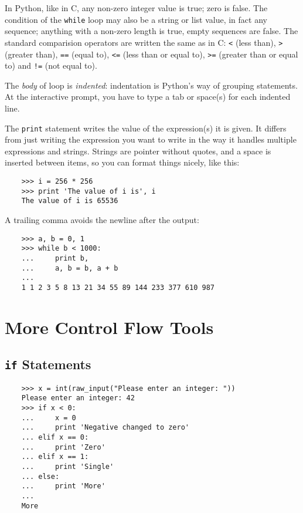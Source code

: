 \documentclass[UTF8]{article}
\begin{document}
In Python, like in C, any non-zero integer value is true; zero is false. The condition of the
\texttt{while} loop may also be a string or list value, in fact any sequence; anything with a
non-zero length is true, empty sequences are false. The standard comparision operators are written
the same as in C: \texttt{<} (less than), \texttt{>} (greater than), \texttt{==} (equal to),
\texttt{<=} (less than or equal to), \texttt{>=} (greater than or equal to) and \texttt{!=} (not
equal to).

The \emph{body} of loop is \emph{indented}: indentation is Python's way of grouping statements.
At the interactive prompt, you have to type a tab or space(s) for each indented line.

The \texttt{print} statement writes the value of the expression(s) it is given. It differs from
just writing the expression you want to write in the way it handles multiple expressions and
strings. Strings are pointer without quotes, and a space is inserted between items, so you can
format things nicely, like this:
\begin{verbatim}
    >>> i = 256 * 256
    >>> print 'The value of i is', i
    The value of i is 65536
\end{verbatim}

A trailing comma avoids the newline after the output:
\begin{verbatim}
    >>> a, b = 0, 1
    >>> while b < 1000:
    ...     print b,
    ...     a, b = b, a + b
    ...
    1 1 2 3 5 8 13 21 34 55 89 144 233 377 610 987
\end{verbatim}

\section{More Control Flow Tools}
\subsection{\texttt{if} Statements}
\begin{verbatim}
    >>> x = int(raw_input("Please enter an integer: "))
    Please enter an integer: 42
    >>> if x < 0:
    ...     x = 0
    ...     print 'Negative changed to zero'
    ... elif x == 0:
    ...     print 'Zero'
    ... elif x == 1:
    ...     print 'Single'
    ... else:
    ...     print 'More'
    ...
    More
\end{verbatim}
\end{document}
